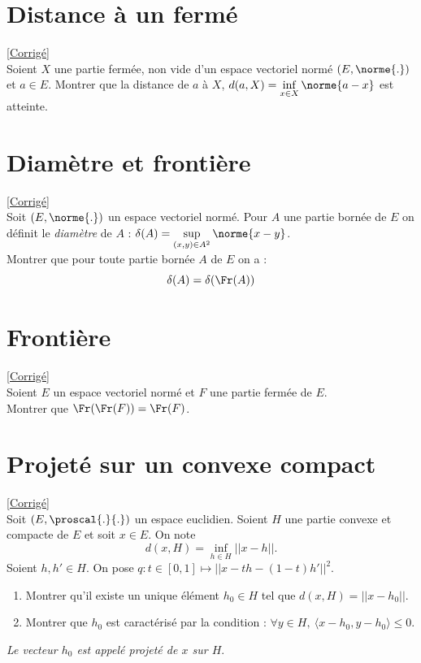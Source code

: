 \documentclass{book}
\begin{document}
\section{Distance à un fermé}
\label{Distance à un fermé}
\textcolor{blue}{\hyperref[sec:distance-a-un-ferme]{[Corrigé]}}\\
Soient $X$ une partie fermée, non vide d'un espace vectoriel normé $(E,\norme{.})$ et $a\in E$.
Montrer que la distance de $a$ à $X$, $d(a,X)=\inf\limits_{x\in X}{\norme{a-x}}$ est atteinte.

\section{Diamètre et frontière}
\label{Diamètre et frontière}
\textcolor{blue}{\hyperref[sec:diametre-et-frontiere]{[Corrigé]}}\\
Soit $(E,\norme{.})$ un espace vectoriel normé. Pour $A$ une partie bornée de $E$ on définit le \textit{diamètre} de $A$ : $\delta(A)=\sup\limits_{(x,y)\in A^2}\norme{x-y}$.\\
Montrer que pour toute partie bornée $A$ de $E$ on a :
$$\delta(A)=\delta(\Fr(A))$$

\section{Frontière }
\label{Frontière}
\textcolor{blue}{\hyperref[sec:frontiere]{[Corrigé]}}\\
Soient $E$ un espace vectoriel normé et $F$ une partie fermée de $E$.\\
Montrer que $\Fr(\Fr(F))=\Fr(F)$.

\section{Projeté sur un convexe compact }
\label{Projeté convexe}
\textcolor{blue}{\hyperref[sec:projete-sur-un-convexe-compact]{[Corrigé]}}\\
Soit $(E,\proscal{.}{.})$ un espace euclidien. Soient $H$ une partie convexe et compacte de $E$ et soit $x\in E$. On note
$$d(x,H)=\inf\limits_{h\in H}{||x-h||}.$$
Soient $h,h'\in H$. On pose $q:t\in [0,1]\longmapsto ||x-th-(1-t)h'||^2$.
\begin{enumerate}[leftmargin=*]
	\item Montrer qu'il existe un unique élément $h_0\in H$ tel que $d(x,H)=||x-h_0||$.\\
	\item Montrer que $h_0$ est caractérisé par la condition : $\forall y\in H,\ \langle x-h_0,y-h_0\rangle\leq 0$.
\end{enumerate}
\textit{Le vecteur $h_0$ est appelé projeté de $x$ sur $H$}.
\end{document}
